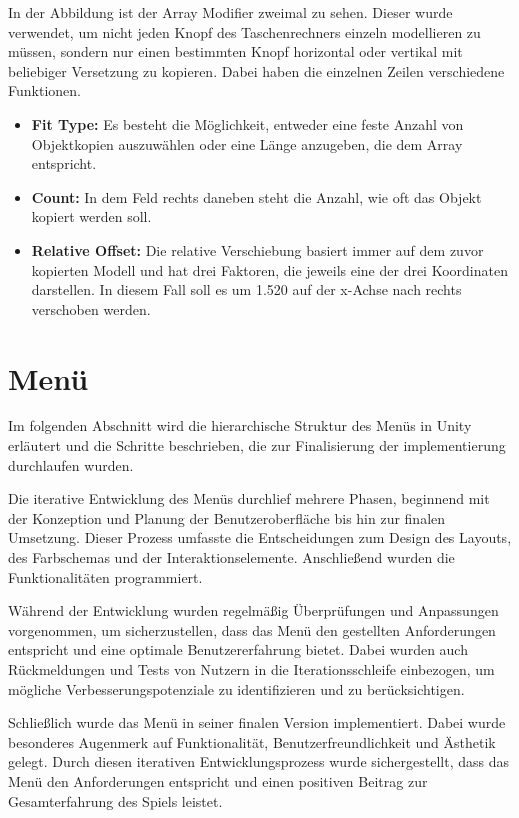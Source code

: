 In der Abbildung ist der Array Modifier zweimal zu sehen. Dieser wurde verwendet, um nicht jeden Knopf des Taschenrechners
einzeln modellieren zu müssen, sondern nur einen bestimmten Knopf horizontal oder vertikal mit beliebiger Versetzung zu
kopieren. Dabei haben die einzelnen Zeilen verschiedene Funktionen.
\begin{itemize}
\item \textbf{Fit Type:} Es besteht die Möglichkeit, entweder eine feste Anzahl von Objektkopien auszuwählen oder eine
Länge anzugeben, die dem Array entspricht.
\item \textbf{Count:} In dem Feld rechts daneben steht die Anzahl, wie oft das Objekt kopiert werden soll.
\item \textbf{Relative Offset:} Die relative Verschiebung basiert immer auf dem zuvor kopierten Modell und hat drei
Faktoren, die jeweils eine der drei Koordinaten darstellen. In diesem Fall soll es um 1.520 auf der x-Achse nach rechts
verschoben werden.
\end{itemize}

\section{Menü}
Im folgenden Abschnitt wird die hierarchische Struktur des Menüs in Unity erläutert und die Schritte beschrieben, die
zur Finalisierung der implementierung durchlaufen wurden.

Die iterative Entwicklung des Menüs durchlief mehrere Phasen, beginnend mit der Konzeption und Planung der
Benutzeroberfläche bis hin zur finalen Umsetzung. Dieser Prozess umfasste die Entscheidungen zum Design des Layouts,
des Farbschemas und der Interaktionselemente. Anschließend wurden die Funktionalitäten programmiert.

Während der Entwicklung wurden regelmäßig Überprüfungen und Anpassungen vorgenommen, um sicherzustellen, dass das Menü
den gestellten Anforderungen entspricht und eine optimale Benutzererfahrung bietet. Dabei wurden auch Rückmeldungen und
Tests von Nutzern in die Iterationsschleife einbezogen, um mögliche Verbesserungspotenziale zu identifizieren und zu
berücksichtigen.

Schließlich wurde das Menü in seiner finalen Version implementiert. Dabei wurde besonderes Augenmerk auf Funktionalität,
Benutzerfreundlichkeit und Ästhetik gelegt. Durch diesen iterativen Entwicklungsprozess wurde sichergestellt, dass das
Menü den Anforderungen entspricht und einen positiven Beitrag zur Gesamterfahrung des Spiels leistet.

